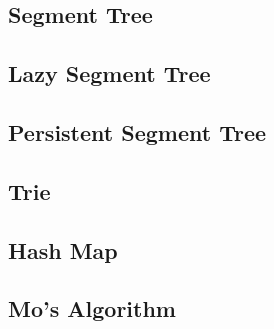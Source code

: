 \subsection{Segment Tree}

\subsection{Lazy Segment Tree}

\subsection{Persistent Segment Tree}

\subsection{Trie}

\subsection{Hash Map}

\subsection{Mo's Algorithm}













